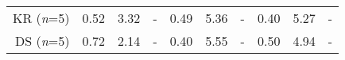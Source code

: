 \begin{table*}[ht]
\begin{tabular}{rccccccccc}
KR (\textit{n}=5)  &      0.52      & 3.32   &  -  &  0.49  &  5.36       & -  &     0.40   &   5.27 &    -   \\
DS (\textit{n}=5)  &    0.72       &  2.14 &  -  &  0.40 &    5.55   & -  &   0.50    &   4.94 &    -   \\\cmidrule(lr){2-10}


\end{tabular}
\end{table*}
